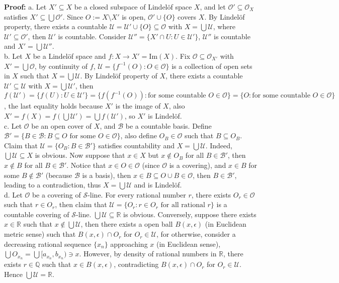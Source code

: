 \documentclass[12pt]{article}
\begin{document}
\textbf{Proof:} a. Let $X'\subseteq X$ be a closed subspace of Lindelöf space $X$, and let $\mathcal{O}'\subseteq\mathcal{O}_{X}$ satisfies $X'\subseteq\bigcup\mathcal{O}'$. Since $O:=X\setminus X'$ is open, $\mathcal{O}'\cup \{O\}$ covers $X$. By Lindelöf property, there exists a countable $\mathcal{U}=\mathcal{U}'\cup\{O\}\subseteq\mathcal{O}$ with $X=\bigcup\mathcal{U}$, where $\mathcal{U}'\subseteq\mathcal{O}'$, then $\mathcal{U}'$ is countable. Consider $\mathcal{U''}=\{X'\cap U: U\in\mathcal{U}'\}$, $\mathcal{U}''$ is countable and $X'=\bigcup\mathcal{U}''$.\\
\indent b. Let $X$ be a Lindelöf space and $f: X\to X'=\text{Im}(X)$. Fix $\mathcal{O}\subseteq\mathcal{O}_{X'}$ with $X'=\bigcup\mathcal{O}$, by continuity of $f$, $\mathcal{U}=\{f^{-1}(O): O\in\mathcal{O}\}$ is a collection of open sets in $X$ such that $X=\bigcup\mathcal{U}$. By Lindelöf property of $X$, there exists a countable $\mathcal{U}'\subseteq\mathcal{U}$ with $X=\bigcup\mathcal{U}'$, then $f(\mathcal{U}')=\{f(U): U\in\mathcal{U}'\}=\{f(f^{-1}(O)): \text{for some countable } O\in\mathcal{O}\}=\{O: \text{for some countable } O\in\mathcal{O}\}$, the last equality holds because $X'$ is the image of $X$, also $X'=f(X)=f(\bigcup\mathcal{U}')=\bigcup f(\mathcal{U}')$, so $X'$ is Lindelöf. \\
\indent c. Let $\mathcal{O}$ be an open cover of $X$, and $\mathcal{B}$ be a countable basis. Define $\mathcal{B}'=\{B\in\mathcal{B}: B\subseteq O\text{ for some }O\in\mathcal{O}\}$, also define $O_{B}\in\mathcal{O}$ such that $B\subseteq O_{B}$. Claim that $\mathcal{U}=\{O_{B}: B\in\mathcal{B}'\}$ satisfies countability and $X=\bigcup\mathcal{U}$. Indeed, $\bigcup\mathcal{U}\subseteq X$ is obvious. Now suppose that $x\in X$ but $x\notin O_{B}$ for all $B\in \mathcal{B}'$, then $x\notin B$ for all $B\in\mathcal{B}'$. Notice that $x\in O\in\mathcal{O}$ (since $\mathcal{O}$ is a covering), and $x\in B$ for some $B\notin \mathcal{B}'$ (because $\mathcal{B}$ is a basis), then $x\in B\subseteq O\cup B\in\mathcal{O}$, then $B\in\mathcal{B}'$, leading to a contradiction, thus $X=\bigcup\mathcal{U}$ and is Lindelöf. \\
\indent d. Let $\mathcal{O}$ be a covering of $\mathcal{S}$-line. For every rational number $r$, there exists $O_{r}\in\mathcal{O}$ such that $r\in O_{r}$, then claim that $\mathcal{U}=\{O_{r}: r\in O_{r}\text{ for all rational }r\}$ is a countable covering of $\mathcal{S}$-line. $\bigcup\mathcal{U}\subseteq\mathbb{R}$ is obvious. Conversely, suppose there exists $x\in\mathbb{R}$ such that $x\notin \bigcup\mathcal{U}$, then there exists a open ball $B(x,\epsilon)$ (in Euclidean metric sense) such that $B(x,\epsilon)\cap O_{r}$ for $O_{r}\in\mathcal{U}$, for otherwise, consider a decreasing rational sequence $\{x_{n}\}$ approaching $x$ (in Euclidean sense), $\bigcup O_{x_{n}}=\bigcup [a_{x_{n}}, b_{x_{n}})\ni x$. However, by density of rational numbers in $\mathbb{R}$, there exists $r\in\mathbb{Q}$ such that $x\in B(x,\epsilon)$, contradicting $B(x,\epsilon)\cap O_{r}$ for $O_{r}\in\mathcal{U}$. Hence $\bigcup\mathcal{U}=\mathbb{R}$. \\
\end{document}

